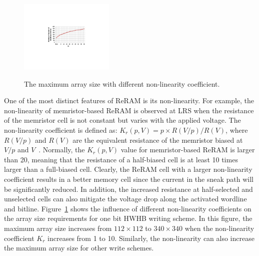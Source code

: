 \begin{figure}[!b]
\centering
  \includegraphics[width=0.4\textwidth]{./figures/non_linear_f}\\
  \caption{The maximum array size with different non-linearity coefficient.}\label{fig:non_linear}
\end{figure}
One of the most distinct features of ReRAM is its non-linearity. For example, the non-linearity of memristor-based ReRAM is observed at LRS when the resistance of the memristor cell is not constant but varies with the applied voltage. The non-linearity coefficient is defined as:
$K_r(p,V) = p \times R(V/p)/R(V)$, where $R(V/p)$ and $R(V)$ are the equivalent resistance of the memristor biased at $V/p$ and $V$~\cite{memristor:Cong}. Normally, the $K_r(p,V)$ value for memristor-based ReRAM is larger than 20, meaning that the resistance of a half-biased  cell is at least 10 times larger than a full-biased cell. Clearly, the ReRAM cell with a larger non-linearity coefficient results in a better memory cell since the current in the sneak path will be significantly reduced. In addition, the increased resistance at half-selected and unselected cells can also mitigate the voltage drop along the activated wordline and bitline. Figure~\ref{fig:non_linear} shows the influence of different non-linearity coefficients on the array size requirements for one bit HWHB writing scheme. In this figure, the maximum array size increases from $112 \times 112$ to $340 \times 340$ when the non-linearity coefficient $K_r$ increases from 1 to 10. Similarly, the non-linearity can also increase the maximum array size for other write schemes.


